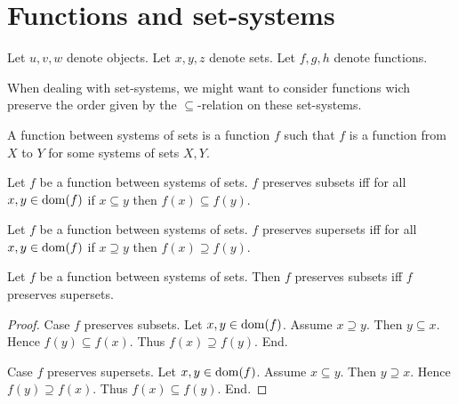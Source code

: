 \documentclass[../../set-theory.tex]{subfiles}
\begin{document}
  \section{Functions and set-systems}

  \begin{forthel}
  \end{forthel}

  \begin{forthel}
  \end{forthel}

  \begin{forthel}
    Let $u,v,w$ denote objects.
    Let $x,y,z$ denote sets.
    Let $f,g,h$ denote functions.
  \end{forthel}

  \noindent When dealing with set-systems, we might want to consider functions
  wich preserve the order given by the $\subseteq$-relation on these
  set-systems.

  \begin{forthel}
    \begin{definition}
      A function between systems of sets is a function $f$ such that $f$ is a function from $X$ to $Y$ for some systems of sets $X, Y$.
    \end{definition}

    \begin{definition}
      Let $f$ be a function between systems of sets.
      $f$ preserves subsets iff for all $x,y \in \operatorname{dom}(f)$ if $x \subseteq y$ then $f(x) \subseteq f(y)$.
    \end{definition}

    \begin{definition}
      Let $f$ be a function between systems of sets.
      $f$ preserves supersets iff for all $x,y \in \operatorname{dom}(f)$ if $x \supseteq y$ then $f(x) \supseteq f(y)$.
    \end{definition}

    \begin{lemma}
      Let $f$ be a function between systems of sets.
      Then $f$ preserves subsets iff $f$ preserves supersets.
    \end{lemma}
    \begin{proof}
      Case $f$ preserves subsets.
        Let $x,y \in \operatorname{dom}(f)$.
        Assume $x \supseteq y$.
        Then $y \subseteq x$.
        Hence $f(y) \subseteq f(x)$.
        Thus $f(x) \supseteq f(y)$.
      End.

      Case $f$ preserves supersets.
        Let $x,y \in \operatorname{dom}(f)$.
        Assume $x \subseteq y$.
        Then $y \supseteq x$.
        Hence $f(y) \supseteq f(x)$.
        Thus $f(x) \subseteq f(y)$.
      End.
    \end{proof}
  \end{forthel}
\end{document}
